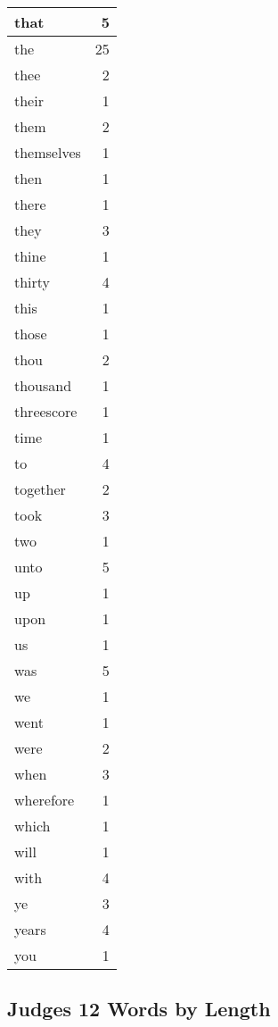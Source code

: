 \begin{center}
\begin{longtable}{l|r}
that & 5\\ \hline 
the & 25\\ \hline 
thee & 2\\ \hline 
their & 1\\ \hline 
them & 2\\ \hline 
themselves & 1\\ \hline 
then & 1\\ \hline 
there & 1\\ \hline 
they & 3\\ \hline 
thine & 1\\ \hline 
thirty & 4\\ \hline 
this & 1\\ \hline 
those & 1\\ \hline 
thou & 2\\ \hline 
thousand & 1\\ \hline 
threescore & 1\\ \hline 
time & 1\\ \hline 
to & 4\\ \hline 
together & 2\\ \hline 
took & 3\\ \hline 
two & 1\\ \hline 
unto & 5\\ \hline 
up & 1\\ \hline 
upon & 1\\ \hline 
us & 1\\ \hline 
was & 5\\ \hline 
we & 1\\ \hline 
went & 1\\ \hline 
were & 2\\ \hline 
when & 3\\ \hline 
wherefore & 1\\ \hline 
which & 1\\ \hline 
will & 1\\ \hline 
with & 4\\ \hline 
ye & 3\\ \hline 
years & 4\\ \hline 
you & 1\\ \hline 
\end{longtable}
\end{center}





\subsection{Judges 12 Words by Length}


